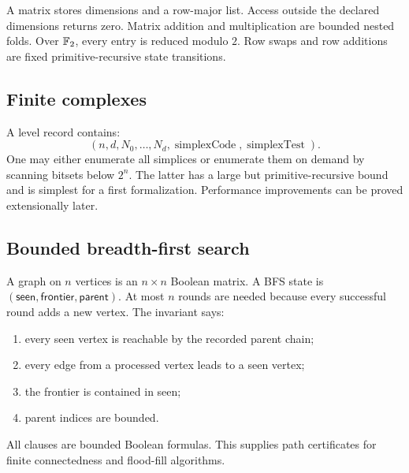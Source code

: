 A matrix stores dimensions and a row-major list.  Access outside the declared dimensions returns zero.  Matrix addition and multiplication are bounded nested folds.  Over $\mathbb{F}_{2}$, every entry is reduced modulo $2$.  Row swaps and row additions are fixed primitive-recursive state transitions.

\subsection{Finite complexes}

A level record contains:
\[
  (n,d,N_0,\ldots,N_d,\operatorname{simplexCode},\operatorname{simplexTest}).
\]
One may either enumerate all simplices or enumerate them on demand by scanning bitsets below $2^n$.  The latter has a large but primitive-recursive bound and is simplest for a first formalization.  Performance improvements can be proved extensionally later.

\subsection{Bounded breadth-first search}

A graph on $n$ vertices is an $n\times n$ Boolean matrix.  A BFS state is $(\mathsf{seen},\mathsf{frontier},\mathsf{parent})$.  At most $n$ rounds are needed because every successful round adds a new vertex.  The invariant says:
\begin{enumerate}
  \item every seen vertex is reachable by the recorded parent chain;
  \item every edge from a processed vertex leads to a seen vertex;
  \item the frontier is contained in seen;
  \item parent indices are bounded.
\end{enumerate}
All clauses are bounded Boolean formulas.  This supplies path certificates for finite connectedness and flood-fill algorithms.
